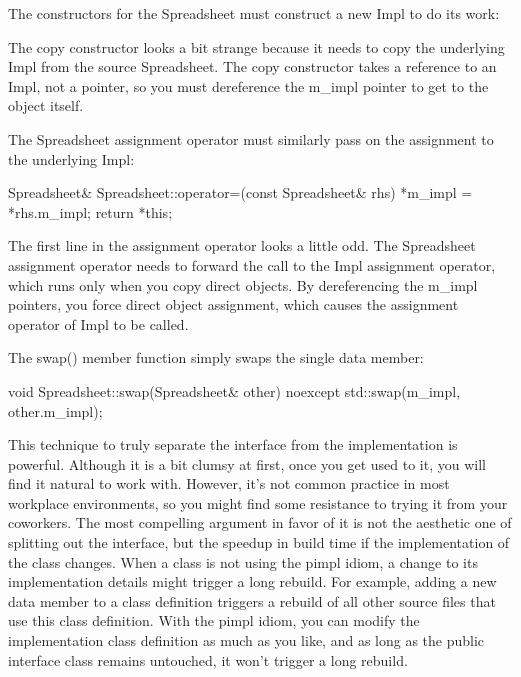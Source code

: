 The constructors for the Spreadsheet must construct a new Impl to do its work:

\begin{cpp}
Spreadsheet::Spreadsheet(size_t width, size_t height)
{
    : m_impl { make_unique<Impl>(width, height) }
}
}

Spreadsheet::Spreadsheet(const Spreadsheet& src)
: m_impl { make_unique<Impl>(*src.m_impl) }
{}
\end{cpp}

The copy constructor looks a bit strange because it needs to copy the underlying Impl from the source Spreadsheet. The copy constructor takes a reference to an Impl, not a pointer, so you must dereference the m\_impl pointer to get to the object itself.

The Spreadsheet assignment operator must similarly pass on the assignment to the underlying Impl:

\begin{cpp}
Spreadsheet& Spreadsheet::operator=(const Spreadsheet& rhs)
{
    *m_impl = *rhs.m_impl;
    return *this;
}
\end{cpp}

The first line in the assignment operator looks a little odd. The Spreadsheet assignment operator needs to forward the call to the Impl assignment operator, which runs only when you copy direct objects. By dereferencing the m\_impl pointers, you force direct object assignment, which causes the assignment operator of Impl to be called.

The swap() member function simply swaps the single data member:

\begin{cpp}
void Spreadsheet::swap(Spreadsheet& other) noexcept
{
    std::swap(m_impl, other.m_impl);
}
\end{cpp}

This technique to truly separate the interface from the implementation is powerful. Although it is a bit clumsy at first, once you get used to it, you will find it natural to work with. However, it’s not common practice in most workplace environments, so you might find some resistance to trying it from your coworkers. The most compelling argument in favor of it is not the aesthetic one of splitting out the interface, but the speedup in build time if the implementation of the class changes. When a class is not using the pimpl idiom, a change to its implementation details might trigger a long rebuild. For example, adding a new data member to a class definition triggers a rebuild of all other source files that use this class definition. With the pimpl idiom, you can modify the implementation class definition as much as you like, and as long as the public interface class remains untouched, it won’t trigger a long rebuild.

